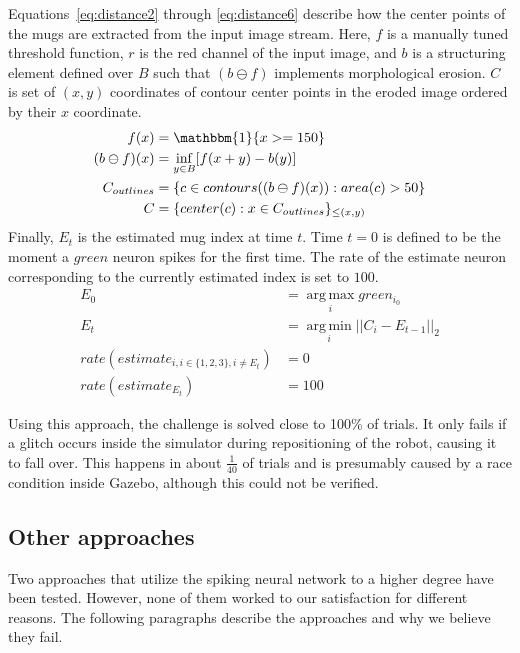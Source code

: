 \documentclass[conference]{IEEEtran}
\DeclareMathOperator*{\argmin}{arg\,min}
\DeclareMathOperator*{\argmax}{arg\,max}
\begin{document}
Equations~\eqref{eq:distance2} through \eqref{eq:distance6} describe how the center points of the mugs are extracted from the input image stream. Here, $f$ is a manually tuned threshold function, $r$ is the red channel of the input image, and $b$ is a structuring element defined over $B$ such that $(b \ominus f)$ implements morphological erosion. $C$ is set of $(x,y)$ coordinates of contour center points in the eroded image ordered by their $x$ coordinate.
\begin{align}
f(x) &= \mathbbm{1}\{x >= 150\}\label{eq:distance2}\\
(b \ominus f)(x) &= \inf\limits_{y\in B}[f(x+y)-b(y)]\\
C_{outlines} &= \{c \in contours((b \ominus f)(x)): area(c) > 50\}\\
C &= \{center(c): x \in C_{outlines}\}_{\leq (x,y)}\label{eq:distance6}\\
\end{align}
Finally, $E_{t}$ is the estimated mug index at time $t$. Time $t=0$ is defined to be the moment a $green$ neuron spikes for the first time. The rate of the estimate neuron corresponding to the currently estimated index is set to $100$.
\begin{align}
E_0 &= \argmax\limits_i green_{i_0} \\ 
E_{t} &= \argmin\limits_{i}||C_i - E_{t-1}||_2 \\
rate(estimate_{i, i\in\{1,2,3\}, i\neq E_{t}}) &= 0 \\
rate(estimate_{E_{t}}) &= 100 
\label{eq:distance10}
\end{align}

Using this approach, the challenge is solved close to 100\% of trials. It only fails if a glitch occurs inside the simulator during repositioning of the robot, causing it to fall over. This happens in about $\frac{1}{40}$ of trials and is presumably caused by a race condition inside Gazebo, although this could not be verified.




\subsection{Other approaches}

Two approaches that utilize the spiking neural network to a higher degree have been tested. However, none of them worked to our satisfaction for different reasons. The following paragraphs describe the approaches and why we believe they fail.
\end{document}
